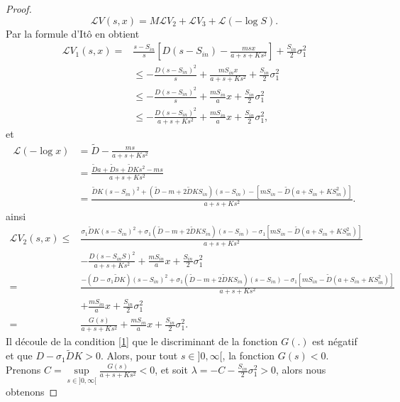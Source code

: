 \documentclass[12pt,a4paper]{report}%
\begin{document}
\begin{proof}
	\begin{equation}\label{3}
		\mathcal{L} V(s, x)=M \mathcal{L} V_2+\mathcal{L} V_3+\mathcal{L}(-\log S) .
	\end{equation}
	Par la formule d'Itô en obtient
	$$
	\begin{aligned}
		\mathcal{L} V_1(s, x)= & \frac{s-S_{in}}{s}\left[D\left(s-S_{in}\right)-\frac{m s x}{a+s+K s^2}\right]+\frac{S_{in}}{2} \sigma_1^2 \\
		& \leq-\frac{D\left(s-S_{in}\right)^2}{s}+\frac{m S_{in} x}{a+s+K s^2}+\frac{S_{in}}{2} \sigma_1^2 \\
		& \leq-\frac{D\left(s-S_{in}\right)^2}{s}+\frac{m S_{in}}{a} x+\frac{S_{in}}{2} \sigma_1^2 \\
		& \leq-\frac{D\left(s-S_{in}\right)^2}{a+s+K s^2}+\frac{m S_{in}}{a} x+\frac{S_{in}}{2} \sigma_1^2,
	\end{aligned}
	$$
	et 
	$$
	\begin{aligned}
		\mathcal{L}(-\log x) & =\tilde{D}-\frac{m s}{a+s+K s^2} \\
		& =\frac{\tilde{D} a+\tilde{D} s+\tilde{D} K s^2-m s}{a+s+K s^2} \\
		& =\frac{\tilde{D} K\left(s-S_{in}\right)^2+\left(\tilde{D}-m+2 \tilde{D} K S_{in}\right)\left(s-S_{in}\right)-\left[m S_{in}-\tilde{D}\left(a+S_{in}+K S_{in}^2\right)\right]}{a+s+K s^2} .
	\end{aligned}
	$$
	ainsi
	\footnotesize{
		$$
		\begin{aligned}
			\mathcal{L} V_2(s, x) \leq & \frac{\sigma_1 \tilde{D} K\left(s-S_{in}\right)^2+\sigma_1\left(\tilde{D}-m+2 \tilde{D} K S_{in}\right)\left(s-S_{in}\right)-\sigma_1\left[m S_{in}-\tilde{D}\left(a+S_{in}+K S_{in}^2\right)\right]}{a+s+K s^2} \\
			& -\frac{D\left(s-S_{in}S\right)^2}{a+s+K s^2}+\frac{m S_{in}}{a} x+\frac{S_{in}}{2} \sigma_1^2 \\
			= & \frac{-\left(D-\sigma_1 \tilde{D} K\right)\left(s-S_{in}\right)^2+\sigma_1\left(\tilde{D}-m+2 \tilde{D} K S_{in}\right)\left(s-S_{in}\right)-\sigma_1\left[m S_{in}-\tilde{D}\left(a+S_{in}+K S_{in}^2\right)\right]}{a+s+K s^2} \\
			& +\frac{m S_{in}}{a} x+\frac{S_{in}}{2} \sigma_1^2 \\
			= & \frac{G(s)}{a+s+K s^2}+\frac{m S_{in}}{a } x+\frac{S_{in}}{2} \sigma_1^2 .
		\end{aligned}
		$$
	}
	Il découle de la condition \eqref{1} que le discriminant de la fonction \( G(.) \) est négatif et que \( D-\sigma_1 \tilde{D} K>0 \). Alors, pour tout \( s \in ]0, \infty[ \), la fonction \( G(s) < 0 \). Prenons \( C = \sup\limits_{s \in ]0, \infty[} \frac{G(s)}{a + s + K s^2} < 0 \), et soit \( \lambda = -C - \frac{S_{in}}{2} \sigma_1^2 > 0 \), alors nous obtenons

\end{proof}
\end{document}
